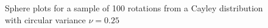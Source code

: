 \documentclass[12pt]{article}
\begin{document}
\begin{figure}
\centering
{}
\caption{\label{fig:eye-cayley}Sphere plots for a sample of 100 rotations from a Cayley distribution with circular variance $\nu=0.25$}
\end{figure}
\end{document}
